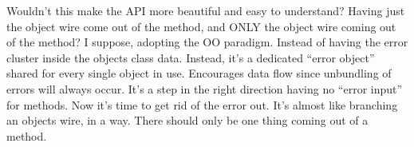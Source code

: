 \documentclass{article}
\begin{document}
Wouldn't this make the API more beautiful and easy to understand? Having just the object wire come out of the method, and ONLY the object wire coming out of the method?
I suppose, adopting the OO paradigm.
Instead of having the error cluster inside the objects class data.
Instead, it's a dedicated “error object” shared for every single object in use.
Encourages data flow since unbundling of errors will always occur.
It's a step in the right direction having no “error input” for methods.
Now it's time to get rid of the error out.
It's almost like branching an objects wire, in a way. There should only be one thing coming out of a method.
\end{document}
